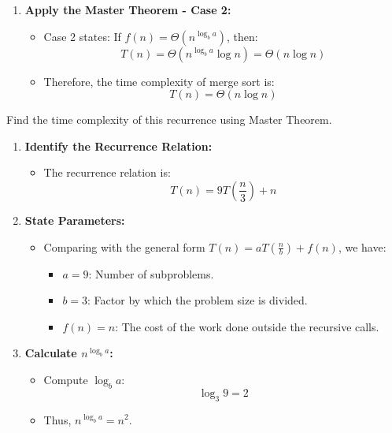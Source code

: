 \begin{example}
\begin{enumerate}
            \item \textbf{Apply the Master Theorem - Case 2:}
            \begin{itemize}
                \item Case 2 states: If \( f(n) = \Theta(n^{\log_b a}) \), then:
                \[
                T(n) = \Theta(n^{\log_b a} \log n) = \Theta(n \log n)
                \]
                \item Therefore, the time complexity of merge sort is:
                \[
                T(n) = \Theta(n \log n)
                \]
            \end{itemize}
        \end{enumerate}
    \end{example}

    \begin{example}
        Find the time complexity of this recurrence using Master Theorem.
        \begin{enumerate}
            \item \textbf{Identify the Recurrence Relation:}
            \begin{itemize}
                \item The recurrence relation is:
                \[
                T(n) = 9T\left(\frac{n}{3}\right) + n
                \]
            \end{itemize}
            
            \item \textbf{State Parameters:}
            \begin{itemize}
                \item Comparing with the general form \( T(n) = aT\left(\frac{n}{b}\right) + f(n) \), we have:
                \begin{itemize}
                    \item \( a = 9 \): Number of subproblems.
                    \item \( b = 3 \): Factor by which the problem size is divided.
                    \item \( f(n) = n \): The cost of the work done outside the recursive calls.
                \end{itemize}
            \end{itemize}
            
            \item \textbf{Calculate \( n^{\log_b a} \):}
            \begin{itemize}
                \item Compute \( \log_b a \):
                \[
                \log_3 9 = 2
                \]
                \item Thus, \( n^{\log_b a} = n^2 \).
            \end{itemize}
            

\end{enumerate}
\end{example}
